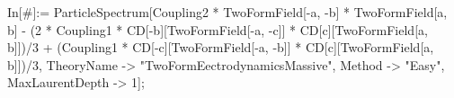 In[#]:= ParticleSpectrum[Coupling2 * TwoFormField[-a, -b] * TwoFormField[a, b] - (2 * Coupling1 * CD[-b][TwoFormField[-a, -c]] * CD[c][TwoFormField[a, b]])/3 + (Coupling1 * CD[-c][TwoFormField[-a, -b]] * CD[c][TwoFormField[a, b]])/3, TheoryName -> "TwoFormEectrodynamicsMassive", Method -> "Easy", MaxLaurentDepth -> 1]; 